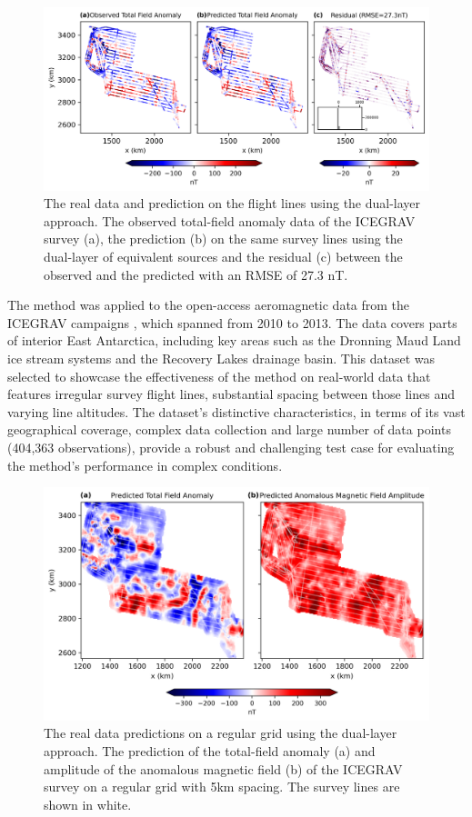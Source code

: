 \begin{figure}[tb!]
\centering
\includegraphics[width=1\linewidth]{figures/real_line_pred.png}
\caption{
    The real data and prediction on the flight lines using the dual-layer approach. The observed total-field anomaly data of the ICEGRAV survey \citep{ICEGRAV_data} (a), the prediction (b) on the same survey lines using the dual-layer of equivalent sources and the residual (c) between the observed and the predicted with an RMSE of 27.3 nT.
}
\label{fig:real_line_pred}
\end{figure}

The method was applied to the open-access aeromagnetic data from the ICEGRAV campaigns \citep{ICEGRAV_data}, which spanned from 2010 to 2013. The data covers parts of interior East Antarctica, including key areas such as the Dronning Maud Land ice stream systems and the Recovery Lakes drainage basin. This dataset was selected to showcase the effectiveness of the method on real-world data that features irregular survey flight lines, substantial spacing between those lines and varying line altitudes. The dataset’s distinctive characteristics, in terms of its vast geographical coverage, complex data collection and large number of data points (404,363 observations), provide a robust and challenging test case for evaluating the method's performance in complex conditions.

\begin{figure}[tb!]
\centering
\includegraphics[width=1\linewidth]{figures/real_grid_pred.png}
\caption{
    The real data predictions on a regular grid using the dual-layer approach. The prediction of the total-field anomaly (a) and amplitude of the anomalous magnetic field (b) of the ICEGRAV survey \citep{ICEGRAV_data} on a regular grid with 5km spacing. The survey lines are shown in white.
}
\label{fig:real_grid_pred}
\end{figure}

